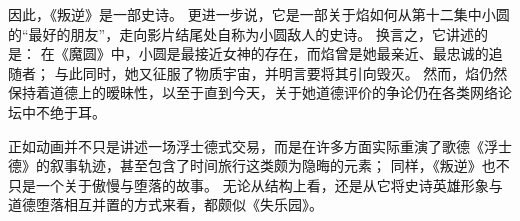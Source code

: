 因此，《叛逆》是一部史诗。
更进一步说，它是一部关于焰如何从第十二集中小圆的“最好的朋友”，走向影片结尾处自称为小圆敌人的史诗。
换言之，它讲述的是：
在《魔圆》中，小圆是最接近女神的存在，而焰曾是她最亲近、最忠诚的追随者；
与此同时，她又征服了物质宇宙，并明言要将其引向毁灭。
然而，焰仍然保持着道德上的暧昧性，以至于直到今天，关于她道德评价的争论仍在各类网络论坛中不绝于耳。

正如动画并不只是讲述一场浮士德式交易，而是在许多方面实际重演了歌德《浮士德》的叙事轨迹，甚至包含了时间旅行这类颇为隐晦的元素；
同样，《叛逆》也不只是一个关于傲慢与堕落的故事。
无论从结构上看，还是从它将史诗英雄形象与道德堕落相互并置的方式来看，都颇似《失乐园》。
